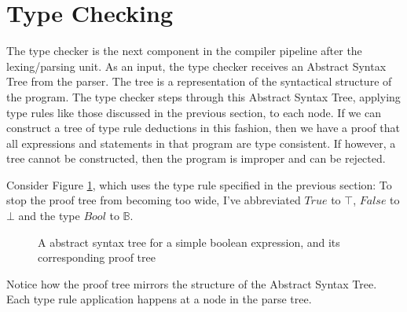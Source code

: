 \documentclass{UoYCSproject}
\begin{document}
\section{Type Checking}
\label{sec:Chap1TypeChecking}
The type checker is the next component in the compiler pipeline after the
lexing/parsing unit. As an input, the type checker receives an Abstract Syntax
Tree from the parser. The tree is a representation of the syntactical structure
of the program. The type checker steps through this Abstract Syntax Tree, applying
type rules like those discussed in the previous section, to each node. If we
can construct a tree of type rule deductions in this fashion, then we have a
proof that all expressions and statements in that program are type consistent.
If however, a tree cannot be constructed, then the program is improper and
can be rejected.

Consider Figure \ref{fig:ParseAndProofTree}, which uses the
type rule specified in the previous section:
To stop the proof tree from becoming too wide, I've abbreviated $True$ to $\top$,
$False$ to $\bot$ and the type $Bool$ to $\mathbb{B}$.
\begin{figure}
    \caption{A abstract syntax tree for a simple boolean expression, and its corresponding proof tree}
    \label{fig:ParseAndProofTree}
\end{figure}
Notice how the proof tree mirrors the structure of the Abstract Syntax Tree.
Each type rule application happens at a node in the parse tree.
\end{document}
